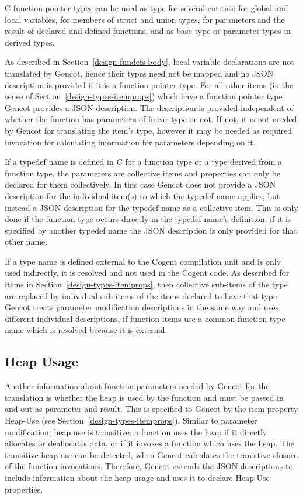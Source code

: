 C function pointer types can be used as type for several entities: for global and local variables, for members of struct
and union types, for parameters and the result of declared and defined functions, and as base type or parameter 
types in derived types.

As described in Section~\ref{design-fundefs-body}, local variable declarations are not translated by Gencot, hence
their types need not be mapped and no JSON description is provided if it is a function pointer type. 
For all other items (in the sense of Section~\ref{design-types-itemprops}) which have a function pointer type Gencot 
provides a JSON description. The
description is provided independent of whether the function has parameters of linear type or not. If not, it is
not needed by Gencot for translating the item's type, however it may be needed as required invocation for
calculating information for parameters depending on it.

If a typedef name is defined in C for a function type or a type derived from a function type, the parameters are collective items
and properties can only be declared for them collectively. In this case Gencot does not provide a JSON description for the individual
item(s) to which the typedef name applies, but instead a JSON description for the typedef name as a collective item. This 
is only done if the function type occurs directly in the typedef name's definition, if it is specified by another typedef
name the JSON description is only provided for that other name.

If a type name is defined external to the Cogent compilation unit and is only used indirectly, it is resolved and not 
used in the Cogent code. As described for items in Section~\ref{design-types-itemprops}, then collective sub-items of the
type are replaced by individual sub-items of the items declared to have that type. Gencot treats parameter modification 
descriptions in the same way and uses different individual descriptions, if function items use a common function type name which 
is resolved because it is external.

\subsection{Heap Usage}
\label{design-parmod-heap}

Another information about function parameters needed by Gencot for the translation is whether the heap is used by the 
function and must be passed in and out as parameter and result. This is specified to Gencot by the item property Heap-Use (see
Section~\ref{design-types-itemprops}). Similar to parameter modification, heap use is transitive: a function uses the heap
if it directly allocates or deallocates data, or if it invokes a function which uses the heap. The transitive heap
use can be detected, when Gencot calculates the transitive closure of the function invocations. Therefore, Gencot
extends the JSON descriptions to include information about the heap usage and uses it to declare Heap-Use properties.

